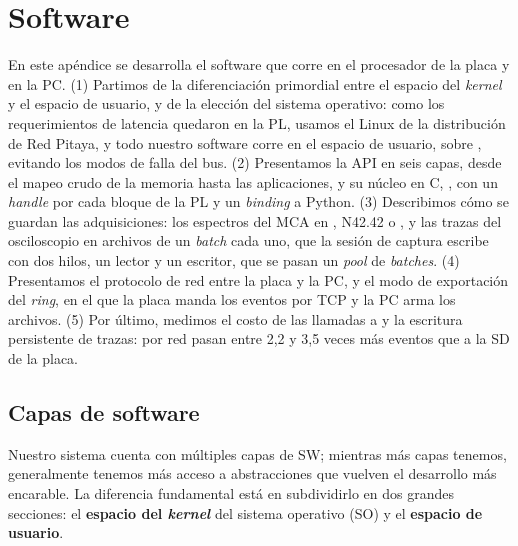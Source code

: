 \chapter{Software}
\label{C:sw}
\label{C:ap-sw}

\graphicspath{{figs/cap10/}{figs/apendices/}{figs/comunes/}}

\begin{destacado}
En este apéndice se desarrolla el software que corre en el procesador de la
placa y en la PC. (1) Partimos de la diferenciación primordial entre el espacio
del \emph{kernel} y el espacio de usuario, y de la elección del sistema operativo: como
los requerimientos de latencia quedaron en la PL, usamos el Linux de la
distribución de Red Pitaya, y todo nuestro software corre en el espacio de
usuario, sobre , evitando los modos de falla del bus. (2)
Presentamos la API en seis capas, desde el mapeo crudo de la memoria hasta las
aplicaciones, y su núcleo en C, , con un \emph{handle} por cada bloque
de la PL y un \emph{binding} a Python. (3) Describimos cómo se guardan las adquisiciones:
los espectros del MCA en , N42.42 o , y las trazas del
osciloscopio en archivos de un \emph{batch} cada uno, que la sesión de captura escribe
con dos hilos, un lector y un escritor, que se pasan un \emph{pool} de \emph{batches}. (4)
Presentamos el protocolo de red entre la placa y la PC, y el modo de exportación
del \emph{ring}, en el que la placa manda los eventos por TCP y la PC arma los
archivos. (5) Por último, medimos el costo de las llamadas a  y
la escritura persistente de trazas: por red pasan entre 2,2 y 3,5 veces más
eventos que a la SD de la placa.
\end{destacado}

\section{Capas de software}
\label{S:sw-capas}

Nuestro sistema cuenta con múltiples capas de SW; mientras más capas tenemos,
generalmente tenemos más acceso a abstracciones que vuelven el desarrollo más
encarable. La diferencia fundamental está en subdividirlo en dos grandes
secciones: el \textbf{espacio del \emph{kernel}} del sistema operativo (SO) y el
\textbf{espacio de usuario}.

